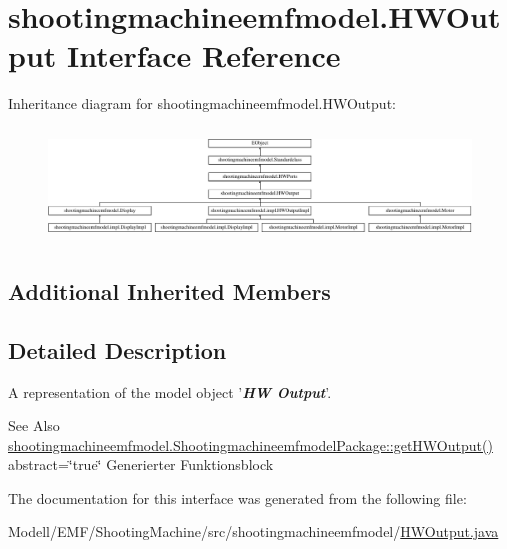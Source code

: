 \hypertarget{interfaceshootingmachineemfmodel_1_1_h_w_output}{\section{shootingmachineemfmodel.\-H\-W\-Output Interface Reference}
\label{interfaceshootingmachineemfmodel_1_1_h_w_output}
}
Inheritance diagram for shootingmachineemfmodel.\-H\-W\-Output\-:\begin{figure}[H]
\begin{center}
\leavevmode
\includegraphics[height=3.043478cm]{interfaceshootingmachineemfmodel_1_1_h_w_output}
\end{center}
\end{figure}
\subsection*{Additional Inherited Members}


\subsection{Detailed Description}
A representation of the model object '{\itshape {\bfseries H\-W Output}}'.

\begin{DoxySeeAlso}{See Also}
\hyperlink{interfaceshootingmachineemfmodel_1_1_shootingmachineemfmodel_package_a2af0244950d949bae77dfe7e98015249}{shootingmachineemfmodel.\-Shootingmachineemfmodel\-Package\-::get\-H\-W\-Output()}  abstract=\char`\"{}true\char`\"{} Generierter Funktionsblock 
\end{DoxySeeAlso}


The documentation for this interface was generated from the following file\-:\begin{DoxyCompactItemize}
\item 
Modell/\-E\-M\-F/\-Shooting\-Machine/src/shootingmachineemfmodel/\hyperlink{_h_w_output_8java}{H\-W\-Output.\-java}\end{DoxyCompactItemize}
